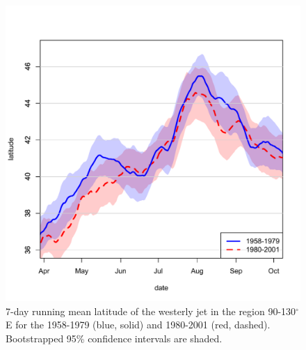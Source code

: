 \documentclass[draft,grl]{AGUTeX}
\begin{document}
\begin{figure}[htbp]
\begin{center}
\includegraphics[width=5in]{Figures/jet_seasonal.pdf}
\caption{7-day running mean latitude of the westerly jet in the region 90-130$^\circ$E for the 1958-1979 (blue, solid) and 1980-2001 (red, dashed). Bootstrapped 95\% confidence intervals are shaded. }
\label{jet_seasonal}
\end{center}
\end{figure}



\end{document}

